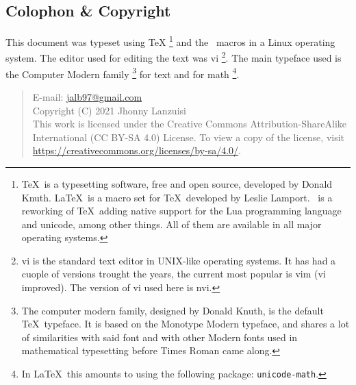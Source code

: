 \newpage
\begin{small}
    \begin{center}
    \begin{minipage}{0.4\paperwidth}
        \section*{Colophon \& Copyright}
        This document was typeset using \TeX%
        \footnote{%
            \TeX\ is
            a typesetting software, free and open source,
            developed by Donald Knuth. \LaTeX\ is a macro
            set for \TeX\ developed by Leslie Lamport. \LuaTeX\ is
            a reworking of \TeX\ adding native support for the Lua
            programming language and unicode, among other things.
            All of them are available in all major
            operating systems.
        }
        and the \LaTeXe\ macros in a Linux operating system.
        The editor used for editing the text was vi%
        \footnote{%
            vi is the standard text editor in UNIX-like
						operating systems. It has had a cuople of versions
						trought the years, the current most popular is vim
						(vi improved). The version of vi used here is
						nvi.
        }.
        The main typeface used is the Computer Modern family%
        \footnote{%
						The computer modern family, designed by Donald Knuth,
						is the default \TeX\ typeface. It is based on the
						Monotype Modern typeface, and shares a lot of similarities
						with said font and with other Modern fonts used in
						mathematical typesetting before Times Roman came along.
        }
        for text and for math%
        \footnote{%
            In \LaTeX\ this amounts to using the following package:
            \texttt{unicode-math}.
        }.

        \medskip
        \begin{quote}\ttfamily\raggedright\footnotesize%
            E-mail: \url{jalb97@gmail.com} \\
            Copyright (C) 2021 Jhonny Lanzuisi \\
            This work is licensed under the Creative Commons Attribution-ShareAlike
            International (CC BY-SA 4.0)  License. To view a copy of the license,
            visit \url{https://creativecommons.org/licenses/by-sa/4.0/}.
        \end{quote}
    \end{minipage}
    \end{center}
\end{small}
\newpage
\tableofcontents
